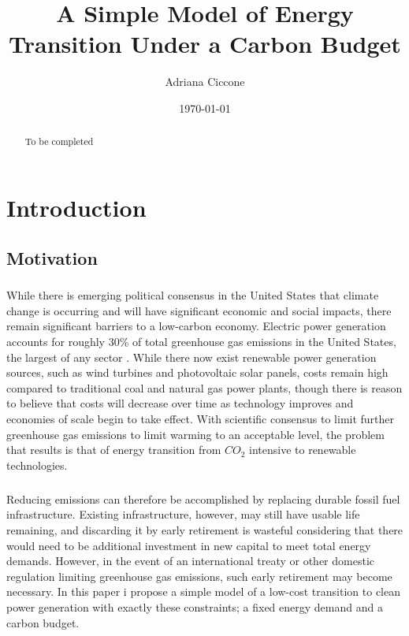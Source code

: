 \documentclass{easychithesis}
\begin{document}
\title{A Simple Model of Energy Transition Under a Carbon Budget} 
\author{Adriana Ciccone}
\date{\today}
\maketitle


\begin{abstract}
To be completed
 \end{abstract}

\tableofcontents

\mainmatter

\chapter{Introduction}
\section{Motivation}

\paragraph{} While there is emerging political consensus in the United States that climate change is occurring and will have significant economic and social impacts, there remain significant barriers to a low-carbon economy. Electric power generation accounts for roughly 30\% of total greenhouse gas emissions in the United States, the largest of any sector \cite{ElectricGHGEmit}. While there now exist renewable power generation sources, such as wind turbines and photovoltaic solar panels, costs remain high compared to traditional coal and natural gas power plants, though there is reason to believe that costs will decrease over time as technology improves and economies of scale begin to take effect. With scientific consensus to limit further greenhouse gas emissions to limit warming to an acceptable level, the problem that results is that of energy transition from $CO_2$ intensive to renewable technologies. 

\paragraph{} Reducing emissions can therefore be accomplished by replacing durable fossil fuel infrastructure. Existing infrastructure, however, may still have usable life remaining, and discarding it by early retirement is wasteful considering that there would need to be additional investment in new capital to meet total energy demands. However, in the event of an international treaty or other domestic regulation limiting greenhouse gas emissions, such early retirement may become necessary. In this paper i propose a simple model of a low-cost transition to clean power generation with exactly these constraints; a fixed energy demand and a carbon budget. 
\end{document}
